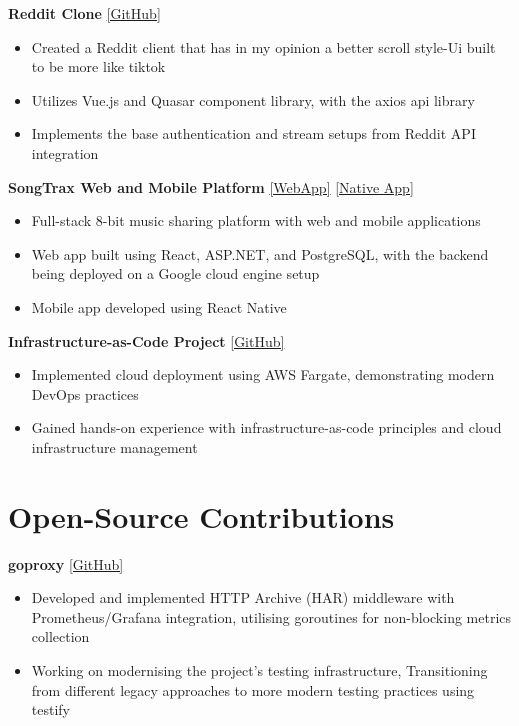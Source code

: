 \documentclass[10pt,a4paper]{article}
\begin{document}
	\textbf{Reddit Clone} \href{https://github.com/CameronBadman/Reddit-Clone}{[GitHub]}
	\begin{itemize}[label=\textbullet, itemsep=0.05cm]
		\item Created a Reddit client that has in my opinion a better scroll style-Ui built to be more like tiktok 
		\item Utilizes Vue.js and Quasar component library, with the axios api library
		\item Implements the base authentication and stream setups from Reddit API integration
	\end{itemize}
	
	\textbf{SongTrax Web and Mobile Platform} \href{https://github.com/CameronBadman/Songtrax-WebApp}{[WebApp]} \href{https://github.com/CameronBadman/Songtrax-NativeApp}{[Native App]}
	\begin{itemize}[label=\textbullet, itemsep=0.05cm]
		\item Full-stack 8-bit music sharing platform with web and mobile applications
		\item Web app built using React, ASP.NET, and PostgreSQL, with the backend being deployed on a Google cloud engine setup
		\item Mobile app developed using React Native
	\end{itemize}
	
	\textbf{Infrastructure-as-Code Project} \href{https://github.com/CameronBadman/Terraform-docker-API}{[GitHub]}
	\begin{itemize}[label=\textbullet, itemsep=0.05cm]
		\item Implemented cloud deployment using AWS Fargate, demonstrating modern DevOps practices
		\item Gained hands-on experience with infrastructure-as-code principles and cloud infrastructure management
	\end{itemize}
	
	\section{Open-Source Contributions}
	\textbf{goproxy} \href{https://github.com/elazarl/goproxy}{[GitHub]}
	\begin{itemize}[label=\textbullet, itemsep=0.05cm]
		\item Developed and implemented HTTP Archive (HAR) middleware with Prometheus/Grafana integration, utilising goroutines for non-blocking metrics collection
		\item Working on modernising the project's testing infrastructure, Transitioning from different legacy approaches to more modern testing practices using testify
	\end{itemize}
	
\end{document}
